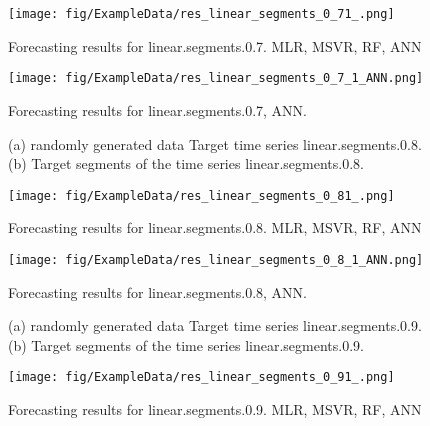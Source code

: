 \documentclass[12pt]{article}
\begin{document}
\begin{figure}
\centering
\texttt{[image: fig/ExampleData/res\_linear\_segments\_0\_71\_.png]}
\caption{Forecasting results for	linear.segments.0.7.	MLR, MSVR, RF, ANN}
\end{figure}


\begin{figure}
\centering
\texttt{[image: fig/ExampleData/res\_linear\_segments\_0\_7\_1\_ANN.png]}
\caption{Forecasting results for	linear.segments.0.7,	ANN.	}
\end{figure}


\begin{figure}
\centering
{}
\caption{(a)	randomly generated data	Target time series	linear.segments.0.8.		(b)		Target segments of the time series	linear.segments.0.8.		}
\end{figure}


\begin{figure}
\centering
\texttt{[image: fig/ExampleData/res\_linear\_segments\_0\_81\_.png]}
\caption{Forecasting results for	linear.segments.0.8.	MLR, MSVR, RF, ANN}
\end{figure}


\begin{figure}
\centering
\texttt{[image: fig/ExampleData/res\_linear\_segments\_0\_8\_1\_ANN.png]}
\caption{Forecasting results for	linear.segments.0.8,	ANN.	}
\end{figure}


\begin{figure}
\centering
{}
\caption{(a)	randomly generated data	Target time series	linear.segments.0.9.		(b)		Target segments of the time series	linear.segments.0.9.		}
\end{figure}



\begin{figure}
\centering
\texttt{[image: fig/ExampleData/res\_linear\_segments\_0\_91\_.png]}
\caption{Forecasting results for	linear.segments.0.9.	MLR, MSVR, RF, ANN}
\end{figure}
\end{document}
